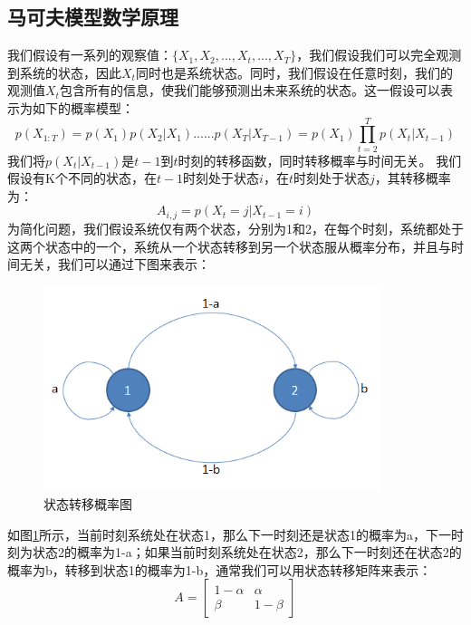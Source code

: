 \documentclass{article}
\begin{document}
\subsection{马可夫模型数学原理}
我们假设有一系列的观察值：$\{ X_{1}, X_{2}, ..., X_{t},...,X_{T} \}$，我们假设我们可以完全观测到系统的状态，因此$X_{t}$同时也是系统状态。同时，我们假设在任意时刻，我们的观测值$X_{t}$包含所有的信息，使我们能够预测出未来系统的状态。这一假设可以表示为如下的概率模型：
\begin{equation}
p(X_{1:T})= p(X_{1})p(X_{2} \vert X_{1})......p(X_{T} \vert X_{T-1})=p(X_{1})\prod_{t=2}^{T} p(X_{t} \vert X_{t-1})
\label{e000082}
\end{equation}
我们将$p(X_{t} \vert X_{t-1})$是$t-1$到$t$时刻的转移函数，同时转移概率与时间无关。\newline
我们假设有K个不同的状态，在$t-1$时刻处于状态$i$，在$t$时刻处于状态$j$，其转移概率为：
\begin{equation}
A_{i,j} = p(X_{t}=j \vert X_{t-1}=i)
\label{e000083}
\end{equation}
为简化问题，我们假设系统仅有两个状态，分别为1和2，在每个时刻，系统都处于这两个状态中的一个，系统从一个状态转移到另一个状态服从概率分布，并且与时间无关，我们可以通过下图来表示：
\begin{figure}[H]
	\caption{状态转移概率图}
	\label{f000068}
	\centering
	\includegraphics[height=6cm]{images/f000068}
\end{figure}
如图\ref{f000068}所示，当前时刻系统处在状态1，那么下一时刻还是状态1的概率为a，下一时刻为状态2的概率为1-a；如果当前时刻系统处在状态2，那么下一时刻还在状态2的概率为b，转移到状态1的概率为1-b，通常我们可以用状态转移矩阵来表示：
\begin{equation}
A = \begin{bmatrix}
1-\alpha & \alpha \\
\beta & 1 - \beta
\end{bmatrix}
\label{e000084}
\end{equation}
\end{document}
